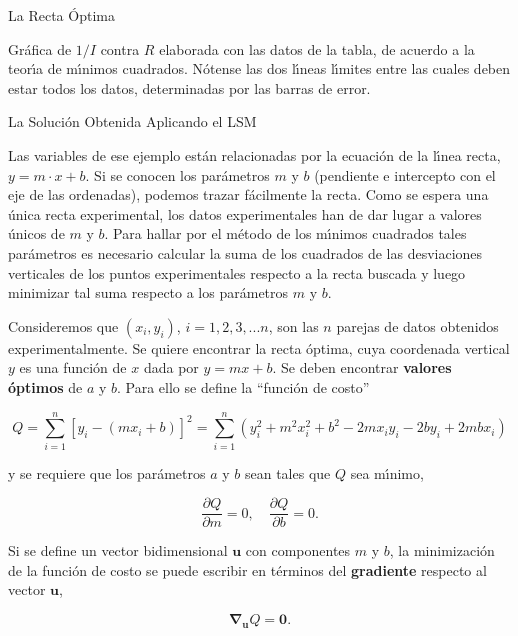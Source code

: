 \documentclass[10pd,hyperref={colorlinks=true}]{beamer}
\begin{document}

\begin{frame}{La Recta \'Optima}

 \vfill
 \centerline{}
 \vfill

{Gr\'afica de $1/I$ contra $R$ elaborada con las datos de la tabla, de 
acuerdo a la teor\'{\i}a de m\'{\i}nimos cuadrados. N\'otense las dos 
l\'{\i}neas l\'{\i}mites entre las cuales deben estar todos los datos, 
determinadas por las barras de error.}

 \vfill

 \end{frame}


\begin{frame}{La Soluci\'on Obtenida Aplicando el LSM}

Las variables de ese ejemplo est\'an relacionadas por la ecuaci\'on de 
la l\'{\i}nea recta, $y= m\cdot x + b$. Si se conocen los par\'ametros 
$m$ y $b$ (pendiente e intercepto con el eje de las ordenadas), podemos 
trazar f\'acilmente la recta. Como se espera una \'unica recta 
experimental, los datos experimentales han de dar lugar a valores 
\'unicos de $m$ y $b$. Para hallar por el m\'etodo de los m\'{\i}nimos 
cuadrados tales par\'ametros es necesario calcular la suma de los 
cuadrados de las desviaciones verticales de los puntos experimentales 
respecto a la recta buscada y luego minimizar tal suma respecto a los 
par\'ametros $m$ y $b$.

 \end{frame}


\begin{frame}{}

Consideremos que $(x_i, y_i)$, $i= 1, 2, 3, ... n$, son las $n$ parejas 
de datos obtenidos experimentalmente. Se quiere encontrar la recta 
\'optima, cuya coordenada vertical $y$ es una funci\'on de $x$ dada por 
$y = m x + b$. Se deben encontrar {\bf valores \'optimos} de $a$ y $b$. 
Para ello se define la ``funci\'on de costo''

$$
Q = \sum\limits_{i=1}^n\left[y_i - (mx_i + b)\right]^2 = 
\sum\limits_{i=1}^n(y_i^2 + m^2x_i^2 + b^2 - 2 mx_iy_i -2 by_i + 2 mbx_i)
$$

y se requiere que los par\'ametros $a$ y $b$ sean tales que $Q$ sea 
m\'{\i}nimo,

$$
\frac{\partial Q}{\partial m} = 0, \quad
\frac{\partial Q}{\partial b} = 0.
$$

Si se define un vector bidimensional $\bm{u}$ con componentes $m$ y $b$, 
la minimizaci\'on de la funci\'on de costo se puede escribir en 
t\'erminos del {\bf gradiente} respecto al vector $\bm{u}$,

$$
\bm{\nabla}_{\bm{u}} Q = \bm{0}.
$$

 \end{frame}
\end{document}
